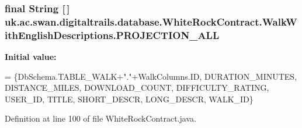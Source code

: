 \hypertarget{classuk_1_1ac_1_1swan_1_1digitaltrails_1_1database_1_1_white_rock_contract_1_1_walk_with_english_descriptions_a61c5e01993f8185871d7be7c84aa6d52}{
\subsubsection[{P\+R\+O\+J\+E\+C\+T\+I\+O\+N\+\_\+\+A\+L\+L}]{\setlength{\rightskip}{0pt plus 5cm}final String \mbox{[}$\,$\mbox{]} uk.\+ac.\+swan.\+digitaltrails.\+database.\+White\+Rock\+Contract.\+Walk\+With\+English\+Descriptions.\+P\+R\+O\+J\+E\+C\+T\+I\+O\+N\+\_\+\+A\+L\+L\hspace{0.3cm}{\ttfamily [static]}}}\label{classuk_1_1ac_1_1swan_1_1digitaltrails_1_1database_1_1_white_rock_contract_1_1_walk_with_english_descriptions_a61c5e01993f8185871d7be7c84aa6d52}
{\bfseries Initial value\+:}
\begin{DoxyCode}
= \{DbSchema.TABLE\_WALK+\textcolor{stringliteral}{"."}+WalkColumns.ID, DURATION\_MINUTES, DISTANCE\_MILES, DOWNLOAD\_COUNT, 
      DIFFICULTY\_RATING, USER\_ID,
                                                        TITLE, SHORT\_DESCR, LONG\_DESCR, WALK\_ID\}
\end{DoxyCode}


Definition at line 100 of file White\+Rock\+Contract.\+java.

